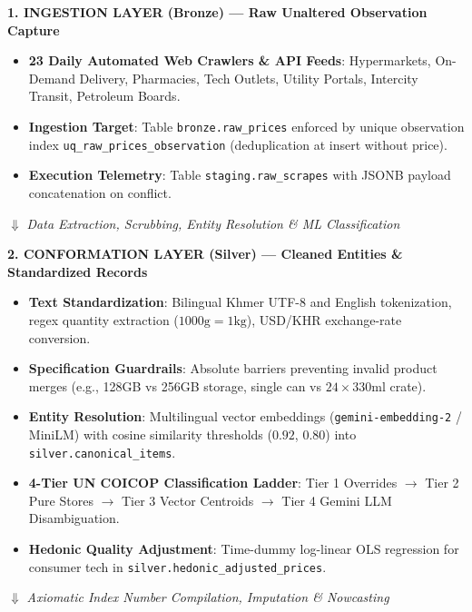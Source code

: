 \documentclass[11pt,a4paper]{article}
\begin{document}
\begin{center}
\begin{tcolorbox}[colback=white,colframe=NavyBlue,width=\textwidth,title=\bfseries Comprehensive Data Platform Architecture]
\small
\textbf{1. INGESTION LAYER (Bronze) --- Raw Unaltered Observation Capture}
\begin{itemize}[noitemsep]
    \item \textbf{23 Daily Automated Web Crawlers \& API Feeds}: Hypermarkets, On-Demand Delivery, Pharmacies, Tech Outlets, Utility Portals, Intercity Transit, Petroleum Boards.
    \item \textbf{Ingestion Target}: Table \texttt{bronze.raw\_prices} enforced by unique observation index \texttt{uq\_raw\_prices\_observation} (deduplication at insert without price).
    \item \textbf{Execution Telemetry}: Table \texttt{staging.raw\_scrapes} with JSONB payload concatenation on conflict.
\end{itemize}
\centering $\Downarrow$ \textit{Data Extraction, Scrubbing, Entity Resolution \& ML Classification} \\
\raggedright
\textbf{2. CONFORMATION LAYER (Silver) --- Cleaned Entities \& Standardized Records}
\begin{itemize}[noitemsep]
    \item \textbf{Text Standardization}: Bilingual Khmer UTF-8 and English tokenization, regex quantity extraction ($1000\text{g} = 1\text{kg}$), USD/KHR exchange-rate conversion.
    \item \textbf{Specification Guardrails}: Absolute barriers preventing invalid product merges (e.g., 128GB vs 256GB storage, single can vs $24\times 330\text{ml}$ crate).
    \item \textbf{Entity Resolution}: Multilingual vector embeddings (\texttt{gemini-embedding-2} / MiniLM) with cosine similarity thresholds ($0.92$, $0.80$) into \texttt{silver.canonical\_items}.
    \item \textbf{4-Tier UN COICOP Classification Ladder}: Tier 1 Overrides $\rightarrow$ Tier 2 Pure Stores $\rightarrow$ Tier 3 Vector Centroids $\rightarrow$ Tier 4 Gemini LLM Disambiguation.
    \item \textbf{Hedonic Quality Adjustment}: Time-dummy log-linear OLS regression for consumer tech in \texttt{silver.hedonic\_adjusted\_prices}.
\end{itemize}
\centering $\Downarrow$ \textit{Axiomatic Index Number Compilation, Imputation \& Nowcasting} \\

\end{tcolorbox}
\end{center}
\end{document}

